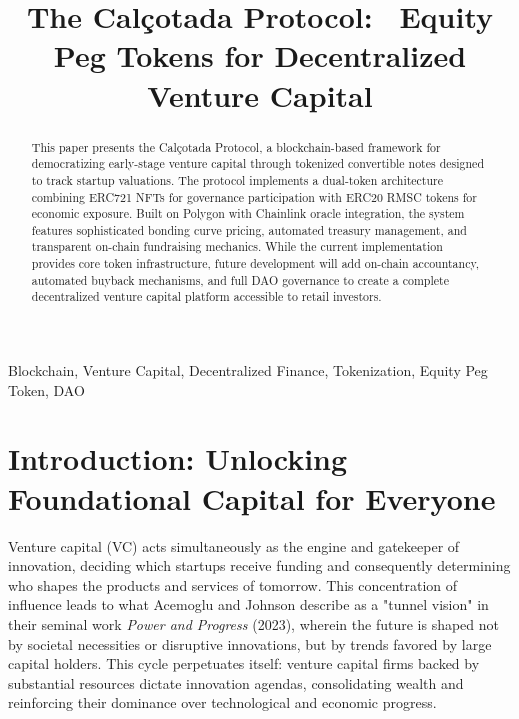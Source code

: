 \documentclass[conference]{IEEEtran}
\begin{document}
\title{The Calçotada Protocol: \ Equity Peg Tokens for Decentralized Venture Capital}

\author{
}

\maketitle

\begin{abstract}
This paper presents the Calçotada Protocol, a blockchain-based framework for democratizing early-stage venture capital through tokenized convertible notes designed to track startup valuations. The protocol implements a dual-token architecture combining ERC721 NFTs for governance participation with ERC20 RMSC tokens for economic exposure. Built on Polygon with Chainlink oracle integration, the system features sophisticated bonding curve pricing, automated treasury management, and transparent on-chain fundraising mechanics. While the current implementation provides core token infrastructure, future development will add on-chain accountancy, automated buyback mechanisms, and full DAO governance to create a complete decentralized venture capital platform accessible to retail investors.
\end{abstract}

\begin{IEEEkeywords}
Blockchain, Venture Capital, Decentralized Finance, Tokenization, Equity Peg Token, DAO
\end{IEEEkeywords}

\section{Introduction: Unlocking Foundational Capital for Everyone}

Venture capital (VC) acts simultaneously as the engine and gatekeeper of innovation, deciding which startups receive funding and consequently determining who shapes the products and services of tomorrow. This concentration of influence leads to what Acemoglu and Johnson describe as a "tunnel vision" in their seminal work \textit{Power and Progress} (2023), wherein the future is shaped not by societal necessities or disruptive innovations, but by trends favored by large capital holders. This cycle perpetuates itself: venture capital firms backed by substantial resources dictate innovation agendas, consolidating wealth and reinforcing their dominance over technological and economic progress.
\end{document}
